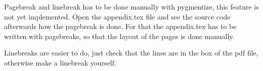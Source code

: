 \pagebreak
Pagebreak and linebreak has to be done manually with pygmentize, this feature is
not yet implemented. Open the appendix.tex file and see the source code
afterwards how the pagebreak is done. For that the appendix.tex has to be
written with pagebreaks, so that the layout of the pages is done manually.

Linebreaks are easier to do, just check that the lines are in the box of the pdf
file, otherwise make a linebreak yourself.
\pagebreak

%
%
%
%
%
%


